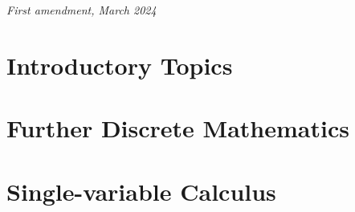\documentclass[
	12pt, %
	fleqn, %
	a4paper, %
]{LegrandOrangeBook}
\theoremstyle{lemmastyle}
\theoremstyle{solutionStyle}
\begin{document}
\noindent \textit{First amendment, March 2024} %


\pagestyle{empty} %

\tableofcontents %

\listoffigures %

\listoftables %

\pagestyle{fancy} %

\cleardoublepage %


\part{Introductory Topics}






\part{Further Discrete Mathematics}




\part{Single-variable Calculus}







\end{document}
